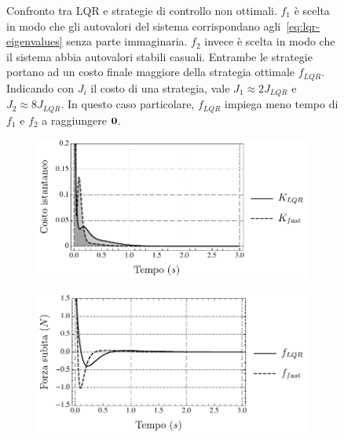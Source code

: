 \begin{figure}
    \caption[Confronto tra LQR e controlli non ottimali]{
        Confronto tra LQR e strategie di controllo non ottimali.
        $f_1$ è scelta in modo che gli autovalori del sistema
        corrispondano agli~\eqref{eq:lqr-eigenvalues} senza parte
        immaginaria. $f_2$ invece è scelta in modo che il
        sistema abbia autovalori stabili casuali. Entrambe le
        strategie portano ad un costo finale maggiore della strategia
        ottimale $f_{LQR}$. Indicando con $J_i$ il costo di
        una strategia, vale $J_1 \approx 2J_{LQR}$ e $J_2 \approx 8J_{LQR}$.
        In questo caso particolare, $f_{LQR}$ impiega meno tempo di $f_1$ e $f_2$
        a raggiungere $\mathbf{0}$.
    }
    \label{fig:ottimalità}
\end{figure}

\begin{figure}
    \centering
    \begin{subfigure}[t]{.48\textwidth}
        \centering
        \includegraphics[width=\textwidth]{assets/nopt1}
    \end{subfigure}
    \hfill
    \begin{subfigure}[t]{.48\textwidth}
        \centering
        \includegraphics[width=\textwidth]{assets/nopt2}
    \end{subfigure}


\end{figure}
